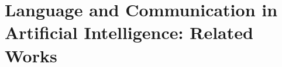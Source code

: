 





\section{Language and Communication in Artificial Intelligence: Related Works}\label{sec:LAMAC_RW} 

